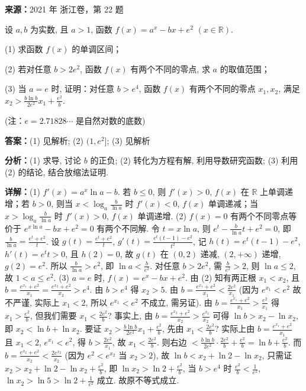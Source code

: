 \begin{question}[points=15]
\textbf{来源：}2021 年 浙江卷，第 22 题\par
设 $a,b$ 为实数, 且 $a>1$, 函数 $f(x)=a^x - bx + e^2$ $(x\in\mathbb{R})$.

(1) 求函数 $f(x)$ 的单调区间；

(2) 若对任意 $b>2e^2$, 函数 $f(x)$ 有两个不同的零点, 求 $a$ 的取值范围；

(3) 当 $a=e$ 时, 证明：对任意 $b>e^4$, 函数 $f(x)$ 有两个不同的零点 $x_1,x_2$, 满足 $x_2 > \frac{b\ln b}{2e^2} x_1 + \frac{e^2}{b}$.

(注：$e=2.71828\cdots$ 是自然对数的底数)
\begin{solution}
\textbf{答案：}(1) 见解析; (2) $(1,e^2]$; (3) 见解析

\textbf{分析：}(1) 求导, 讨论 $b$ 的正负; (2) 转化为方程有解, 利用导数研究函数; (3) 利用 (2) 的结论, 结合放缩法证明.

\textbf{详解：}(1) $f'(x)=a^x\ln a - b$. 若 $b\leq0$, 则 $f'(x)>0$, $f(x)$ 在 $\mathbb{R}$ 上单调递增；若 $b>0$, 则当 $x<\log_a\frac{b}{\ln a}$ 时 $f'(x)<0$, $f(x)$ 单调递减；当 $x>\log_a\frac{b}{\ln a}$ 时 $f'(x)>0$, $f(x)$ 单调递增.
(2) $f(x)=0$ 有两个不同零点等价于 $e^{x\ln a} - bx + e^2=0$ 有两个不同解. 令 $t=x\ln a$, 则 $e^t - \frac{b}{\ln a}t + e^2=0$, 即 $\frac{b}{\ln a} = \frac{e^t+e^2}{t}$. 设 $g(t)=\frac{e^t+e^2}{t}$, $g'(t)=\frac{e^t(t-1)-e^2}{t^2}$, 记 $h(t)=e^t(t-1)-e^2$, $h'(t)=e^t t>0$, 且 $h(2)=0$, 故 $g(t)$ 在 $(0,2)$ 递减, $(2,+\infty)$ 递增, $g(2)=e^2$. 所以 $\frac{b}{\ln a} > e^2$, 即 $\ln a < \frac{b}{e^2}$. 对任意 $b>2e^2$, 需 $\frac{b}{e^2}>2$, 则 $\ln a \leq 2$, 故 $1<a\leq e^2$.
(3) $a=e$ 时, $f(x)=e^x - bx + e^2$. 由 (2) 知有两正根 $x_1<x_2$, 且 $b=\frac{e^{x_1}+e^2}{x_1} = \frac{e^{x_2}+e^2}{x_2} > e^4$. 由 $b>e^4$ 得 $x_2>5$. 由 $b=\frac{e^{x_1}+e^2}{x_1} < \frac{2e^2}{x_1}$ (因为 $e^{x_1}<e^2$ 故不严谨, 实际上 $x_1<2$, 所以 $e^{x_1}<e^2$ 不成立, 需另证). 由 $b=\frac{e^{x_1}+e^2}{x_1} > \frac{e^2}{x_1}$ 得 $x_1 > \frac{e^2}{b}$, 但我们需要 $x_1<\frac{2e^2}{b}$? 事实上, 由 $b=\frac{e^{x_2}+e^2}{x_2} > \frac{e^{x_2}}{x_2}$ 可得 $\ln b > x_2 - \ln x_2$, 即 $x_2 < \ln b + \ln x_2$. 要证 $x_2 > \frac{b\ln b}{2e^2}x_1 + \frac{e^2}{b}$, 先由 $x_1 < \frac{2e^2}{b}$? 实际上由 $b=\frac{e^{x_1}+e^2}{x_1}$ 且 $x_1<2$, $e^{x_1}<e^2$, 得 $b>\frac{2e^2}{x_1}$, 故 $x_1<\frac{2e^2}{b}$. 则右边 $< \frac{b\ln b}{2e^2}\cdot\frac{2e^2}{b}+\frac{e^2}{b} = \ln b + \frac{e^2}{b}$. 而 $b = \frac{e^{x_2}+e^2}{x_2} < \frac{2e^{x_2}}{x_2}$ (因为 $e^2<e^{x_2}$ 当 $x_2>2$), 故 $\ln b < x_2 + \ln2 - \ln x_2$, 只需证 $x_2 > x_2 + \ln2 - \ln x_2 + \frac{e^2}{b}$, 即 $\ln x_2 > \ln2 + \frac{e^2}{b}$, 当 $b>e^4$ 时 $\frac{e^2}{b}<\frac{1}{e^2}$, $\ln x_2 > \ln5 > \ln2 + \frac{1}{e^2}$ 成立. 故原不等式成立.
\end{solution}
\end{question}

